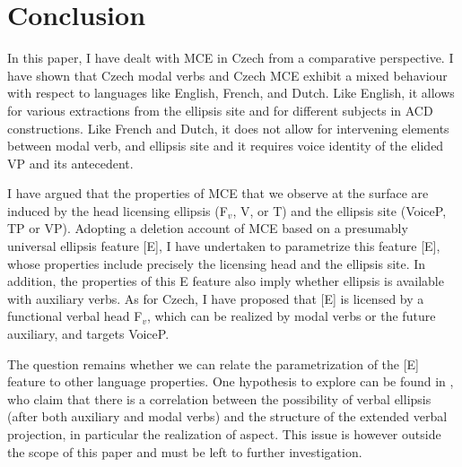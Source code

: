 \documentclass[output=paper,colorlinks,citecolor=brown,
modfonts
]{langscibook}
\begin{document}
\section{Conclusion} \label{sec:6}

In this paper, I have dealt with MCE in Czech from a comparative perspective. I have shown that Czech modal verbs and Czech MCE exhibit a mixed behaviour with respect to languages like English, French, and Dutch. Like English, it allows for various extractions from the ellipsis site and for different subjects in ACD constructions. Like French and Dutch, it does not allow for intervening elements between modal verb, and ellipsis site and it requires voice identity of the elided VP and its antecedent. 

I have argued that the properties of MCE that we observe at the surface are induced by the head licensing ellipsis (F$_{v}$, V, or T) and the ellipsis site (VoiceP, TP or VP). Adopting a deletion account of MCE based on a presumably universal ellipsis feature [E], I have undertaken to parametrize this feature [E], whose properties include precisely the licensing head and the ellipsis site. In addition, the properties of this E feature also imply whether ellipsis is available with auxiliary verbs. As for Czech, I have proposed that [E] is licensed by a functional verbal head F$_{v}$, which can be realized by modal verbs or the future auxiliary, and targets VoiceP. 

The question remains whether we can relate the parametrization of the [E] feature to other language properties. One hypothesis to explore can be found in \cite{Cyrino-Matos2002}, who claim that there is a correlation between the possibility of verbal ellipsis (after both auxiliary and modal verbs) and the structure of the extended verbal projection, in particular the realization of aspect. This issue is however outside the scope of this paper and must be left to further investigation.
\end{document}
